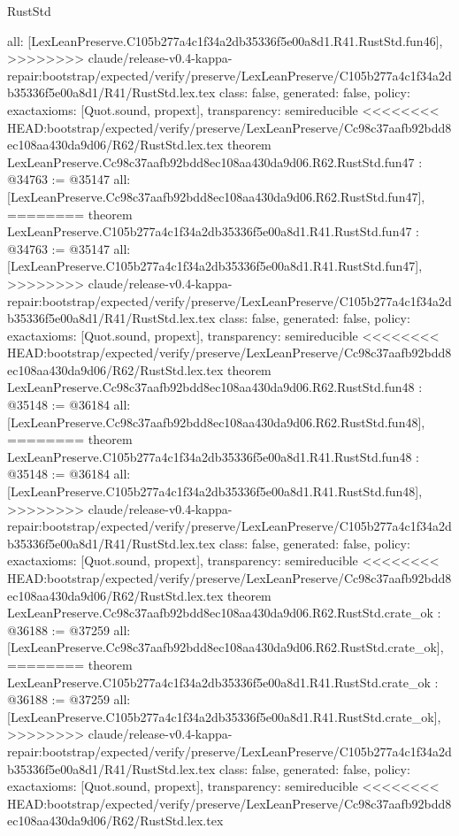 \begin{lexlean}{RustStd}
\begin{coremodule}
{\begin{coremodule}
{{{{{{{{{{{{{{{{{{{{{{{{{{{{{{{{{{{{{{{{{{{{{{{{{{  all: [LexLeanPreserve.C105b277a4c1f34a2db35336f5e00a8d1.R41.RustStd.fun46],
>>>>>>>> claude/release-v0.4-kappa-repair:bootstrap/expected/verify/preserve/LexLeanPreserve/C105b277a4c1f34a2db35336f5e00a8d1/R41/RustStd.lex.tex
  class: false,
  generated: false,
  policy: exact{axioms: [Quot.sound, propext]},
  transparency: semireducible
}
<<<<<<<< HEAD:bootstrap/expected/verify/preserve/LexLeanPreserve/Cc98c37aafb92bdd8ec108aa430da9d06/R62/RustStd.lex.tex
theorem LexLeanPreserve.Cc98c37aafb92bdd8ec108aa430da9d06.R62.RustStd.fun47 : @34763 := @35147 {
  all: [LexLeanPreserve.Cc98c37aafb92bdd8ec108aa430da9d06.R62.RustStd.fun47],
========
theorem LexLeanPreserve.C105b277a4c1f34a2db35336f5e00a8d1.R41.RustStd.fun47 : @34763 := @35147 {
  all: [LexLeanPreserve.C105b277a4c1f34a2db35336f5e00a8d1.R41.RustStd.fun47],
>>>>>>>> claude/release-v0.4-kappa-repair:bootstrap/expected/verify/preserve/LexLeanPreserve/C105b277a4c1f34a2db35336f5e00a8d1/R41/RustStd.lex.tex
  class: false,
  generated: false,
  policy: exact{axioms: [Quot.sound, propext]},
  transparency: semireducible
}
<<<<<<<< HEAD:bootstrap/expected/verify/preserve/LexLeanPreserve/Cc98c37aafb92bdd8ec108aa430da9d06/R62/RustStd.lex.tex
theorem LexLeanPreserve.Cc98c37aafb92bdd8ec108aa430da9d06.R62.RustStd.fun48 : @35148 := @36184 {
  all: [LexLeanPreserve.Cc98c37aafb92bdd8ec108aa430da9d06.R62.RustStd.fun48],
========
theorem LexLeanPreserve.C105b277a4c1f34a2db35336f5e00a8d1.R41.RustStd.fun48 : @35148 := @36184 {
  all: [LexLeanPreserve.C105b277a4c1f34a2db35336f5e00a8d1.R41.RustStd.fun48],
>>>>>>>> claude/release-v0.4-kappa-repair:bootstrap/expected/verify/preserve/LexLeanPreserve/C105b277a4c1f34a2db35336f5e00a8d1/R41/RustStd.lex.tex
  class: false,
  generated: false,
  policy: exact{axioms: [Quot.sound, propext]},
  transparency: semireducible
}
<<<<<<<< HEAD:bootstrap/expected/verify/preserve/LexLeanPreserve/Cc98c37aafb92bdd8ec108aa430da9d06/R62/RustStd.lex.tex
theorem LexLeanPreserve.Cc98c37aafb92bdd8ec108aa430da9d06.R62.RustStd.crate_ok : @36188 := @37259 {
  all: [LexLeanPreserve.Cc98c37aafb92bdd8ec108aa430da9d06.R62.RustStd.crate_ok],
========
theorem LexLeanPreserve.C105b277a4c1f34a2db35336f5e00a8d1.R41.RustStd.crate_ok : @36188 := @37259 {
  all: [LexLeanPreserve.C105b277a4c1f34a2db35336f5e00a8d1.R41.RustStd.crate_ok],
>>>>>>>> claude/release-v0.4-kappa-repair:bootstrap/expected/verify/preserve/LexLeanPreserve/C105b277a4c1f34a2db35336f5e00a8d1/R41/RustStd.lex.tex
  class: false,
  generated: false,
  policy: exact{axioms: [Quot.sound, propext]},
  transparency: semireducible
}
<<<<<<<< HEAD:bootstrap/expected/verify/preserve/LexLeanPreserve/Cc98c37aafb92bdd8ec108aa430da9d06/R62/RustStd.lex.tex
}}}}}}}}}}}}}}}}}}}}}}}}}}}}}}}}}}}}}}}}}}}}}}}}}}}}
\end{coremodule}}
\end{coremodule}
\end{lexlean}
